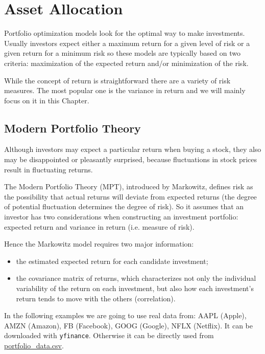\chapter{Asset Allocation}
\label{portfolio-optimization}

Portfolio optimization models look for the optimal way to make investments. Usually investors expect either a maximum return for a given level of risk or a given return for a minimum risk so these models are typically based on two criteria: maximization of the expected return and/or minimization of the risk.

While the concept of return is straightforward there are a variety of risk measures. The most popular one is the variance in return and we will mainly focus on it in this Chapter.

\section{Modern Portfolio Theory}
\label{the-markowitz-meanvariance-portfolio-model}

Although investors may expect a particular return when buying a stock, they also may be disappointed or pleasantly surprised, because fluctuations in stock prices result in fluctuating returns. 

The Modern Portfolio Theory (MPT), introduced by Markowitz, defines risk as the possibility that actual returns will deviate from expected returns (the degree of potential fluctuation determines the degree of risk).
So it assumes that an investor has two considerations when constructing an investment portfolio: expected return and variance in return (i.e. measure of risk). 

Hence the Markowitz model requires two major information:

\begin{itemize}
\tightlist
\item the estimated expected return for each candidate investment;
\item the covariance matrix of returns, which characterizes not only the individual variability of the return on each investment, but also how each investment's return tends to move with the others (correlation).
\end{itemize}

In the following examples we are going to use real data
from:  AAPL (Apple), AMZN (Amazon), FB (Facebook), GOOG (Google), NFLX (Netflix). It can be downloaded with \texttt{yfinance}. Otherwise it can be directly used from \href{https://raw.githubusercontent.com/matteosan1/finance_course/develop/libro/input_files/portfolio_data.csv}{portfolio\_data.csv}.


